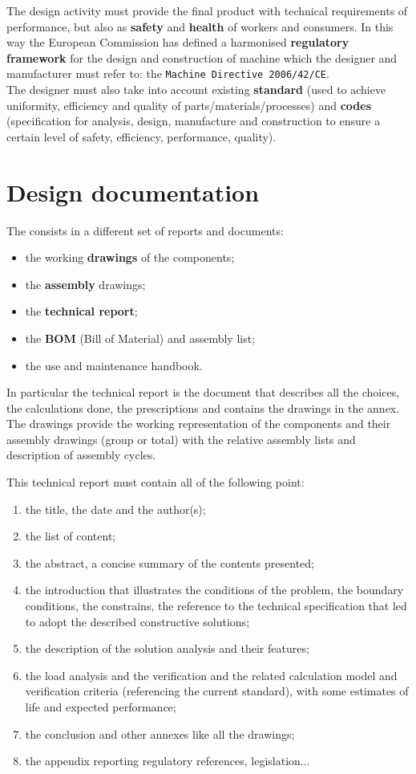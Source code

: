 	The design activity must provide the final product with technical requirements of performance, but also as \textbf{safety} and \textbf{health} of workers and consumers. In this way the European Commission has defined a harmonised \textbf{regulatory framework} for the design and construction of machine which the designer and manufacturer must refer to: the \texttt{Machine Directive 2006/42/CE}.\\
	The designer must also take into account existing \textbf{standard} (used to achieve uniformity, efficiency and quality of parts/materials/processes) and \textbf{codes} (specification for analysis, design, manufacture and construction to ensure a certain level of safety, efficiency, performance, quality).
	
\section{Design documentation}
	The  consists in a different set of reports and documents:
	\begin{itemize}
		\item the working \textbf{drawings} of the components;
		\item the \textbf{assembly} drawings;
		\item the \textbf{technical report};
		\item the \textbf{BOM} (Bill of Material) and assembly list;
		\item the use and maintenance handbook.
	\end{itemize}

	In particular the technical report is the document that describes all the choices, the calculations done, the prescriptions and contains the drawings in the annex. The drawings provide the working representation of the components and their assembly drawings (group or total) with the relative assembly lists and description of assembly cycles.
	
	This technical report must contain all of the following point:
	\begin{enumerate}
		\item the title, the date and the author(s);
		\item the list of content;
		\item the abstract, a concise summary of the contents presented;
		\item the introduction that illustrates the conditions of the problem, the boundary conditions, the constrains, the reference to the technical specification that led to adopt the described constructive solutions;
		\item the description of the solution analysis and their features;
		\item the load analysis and the verification and the related calculation model and verification criteria (referencing the current standard), with some estimates of life and expected performance;
		\item the conclusion and other annexes like all the drawings;
		\item the appendix reporting regulatory references, legislation...
	\end{enumerate}


